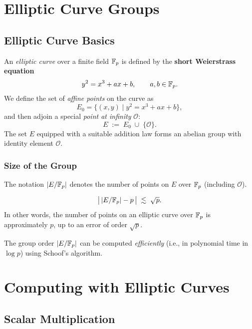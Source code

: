 \documentclass[11pt]{article}
\begin{document}
\section{Elliptic Curve Groups}
\label{sec:ec-groups}

\subsection{Elliptic Curve Basics}

An \emph{elliptic curve} over a finite field $\mathbb{F}_p$ is defined by the
\textbf{short Weierstrass equation}
\[
  y^2 = x^3 + ax + b, \qquad a, b \in \mathbb{F}_p.
\]
We define the set of \emph{affine points} on the curve as
\[
  E_0 = \bigl\{(x, y) \mid y^2 = x^3 + ax + b\bigr\},
\]
and then adjoin a special \emph{point at infinity} $\mathcal{O}$:
\[
  E \;:=\; E_0 \;\cup\; \{\mathcal{O}\}.
\]
The set $E$ equipped with a suitable addition law forms an abelian group
with identity element $\mathcal{O}$.

\subsubsection{Size of the Group}

The notation $|E/\mathbb{F}_p|$ denotes the number of points on $E$ over $\mathbb{F}_p$
(including $\mathcal{O}$).

\begin{theorem}
  \[
    \bigl|\, |E/\mathbb{F}_p| - p \,\bigr| \;\lesssim\; \sqrt{p}.
  \]
  In other words, the number of points on an elliptic curve over $\mathbb{F}_p$
  is approximately $p$, up to an error of order $\sqrt{p}$.
\end{theorem}

\begin{fact}
  The group order $|E/\mathbb{F}_p|$ can be computed \emph{efficiently}
  (i.e., in polynomial time in $\log p$) using Schoof's algorithm.
\end{fact}

\section{Computing with Elliptic Curves}
\label{sec:ec-computing}

\subsection{Scalar Multiplication}
\end{document}

